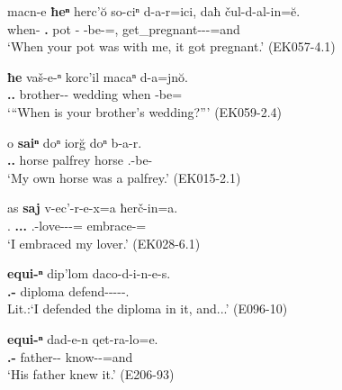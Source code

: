 \begin{exe}
	\ex\label{complexnp-ex02}
	\begin{xlist}
		
		\ex\label{complexnp-ex02a}
		\gll macn-e \textbf{ħeⁿ} herc'\u{o} so-ciⁿ d-a-r=ici, daħ čul-d-al-in=\u{e}. \\
		when-{\Rel} \textbf{{\Ssg}.{\Gen}} pot {\Fsg}-{\Apudess} {\D}-be-{\Imprf}={\Subord}, {\Pv} get\_pregnant-{\D}-{\Intr}-{\Aor}=and \\
		\trans `When your pot was with me, it got pregnant.'
		\hfill (EK057-4.1)
		
		\ex\label{complexnp-ex02b}
		\gll \textbf{ħe} vaš-e-ⁿ korc'il macaⁿ d-a=jn\u{o}. \\
		\textbf{{\Ssg}.{\Gen}.{\Obl}} brother-{\Obl}-{\Gen} wedding when {\D}-be={\Quot} \\
		\trans `{``}When is your brother's wedding?{''}'
		\hfill (EK059-2.4)
		
		\ex\label{complexnp-ex02c}
		\gll o \textbf{saiⁿ} doⁿ ior\u{g} doⁿ b-a-r. \\
		{\Dist} \textbf{{\Fsg}.{\Refl}.{\Gen}} horse palfrey horse {\B}.{\Sg}-be-{\Imprf} \\
		\trans `My own horse was a palfrey.'
		\hfill (EK015-2.1)
		
		\ex\label{complexnp-ex02d}
		\gll as \textbf{saj} v-ec'-r-e-x=a ħerč-in=a. \\
		{\Fsg}.{\Erg} \textbf{{\Fsg}.{\Refl}.{\Gen}.{\Obl}} {\M}.{\Sg}-love-{\Vn}-{\Obl}-{\Cont}={\Emph} embrace-{\Aor}={\Emph} \\
		\trans `I embraced my lover.'
		\hfill (EK028-6.1)
		
		\ex\label{complexnp-ex02e}
		\gll \textbf{equi-ⁿ} dip'lom daco-d-i-n-e-s. \\
		\textbf{{\Med}.{\Obl}-{\Gen}} diploma defend-{\D}-{\Tr}-{\Aor}-{\Seq}-{\Fsg}.{\Erg} \\
		\trans Lit.:`I defended the diploma in it, and...' 
		\hfill (E096-10)
		
		\ex\label{complexnp-ex02f}
		\gll \textbf{equi-ⁿ} dad-e-n qet-ra-lo=e. \\
		\textbf{{\Prox}.{\Obl}-{\Gen}} father-{\Obl}-{\Dat} know-{\Imprf}-{\Sbjv}=and \\
		\trans `His father knew it.'
		\hfill (E206-93)
		
	\end{xlist}
	
	
\end{exe}

